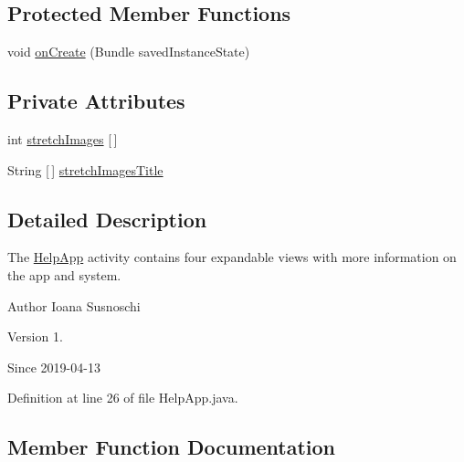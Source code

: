\subsection*{Protected Member Functions}
\begin{DoxyCompactItemize}
\item 
void \mbox{\hyperlink{classcom_1_1example_1_1trainawearapplication_1_1_help_app_a8fb144074fe5f839efbbdbfb16edd528}{on\+Create}} (Bundle saved\+Instance\+State)
\end{DoxyCompactItemize}
\subsection*{Private Attributes}
\begin{DoxyCompactItemize}
\item 
int \mbox{\hyperlink{classcom_1_1example_1_1trainawearapplication_1_1_help_app_a409e91221d680c3d801ea24a3f58fcdc}{stretch\+Images}} \mbox{[}$\,$\mbox{]}
\item 
String \mbox{[}$\,$\mbox{]} \mbox{\hyperlink{classcom_1_1example_1_1trainawearapplication_1_1_help_app_a3f603b19da94b591732a36617c2eb91d}{stretch\+Images\+Title}}
\end{DoxyCompactItemize}


\subsection{Detailed Description}
The \mbox{\hyperlink{classcom_1_1example_1_1trainawearapplication_1_1_help_app}{Help\+App}} activity contains four expandable views with more information on the app and system. 

\begin{DoxyAuthor}{Author}
Ioana Susnoschi 
\end{DoxyAuthor}
\begin{DoxyVersion}{Version}
1. 
\end{DoxyVersion}
\begin{DoxySince}{Since}
2019-\/04-\/13 
\end{DoxySince}


Definition at line 26 of file Help\+App.\+java.



\subsection{Member Function Documentation}
\mbox{\label{classcom_1_1example_1_1trainawearapplication_1_1_help_app_a8fb144074fe5f839efbbdbfb16edd528}} 
